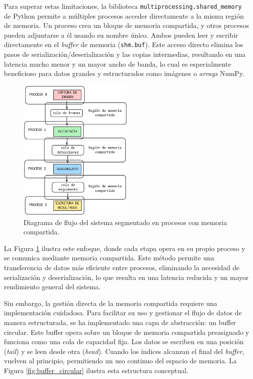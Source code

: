 \documentclass[11pt,spanish,listoffigures,listoftables]{tfgetsinf}
\begin{document}
Para superar estas limitaciones, la biblioteca \texttt{multiprocessing.shared\_memory} de Python permite a múltiples procesos acceder directamente a la misma región de memoria. Un proceso crea un bloque de memoria compartida, y otros procesos pueden adjuntarse a él usando su nombre único. Ambos pueden leer y escribir directamente en el \textit{buffer} de memoria (\texttt{shm.buf}). Este acceso directo elimina los pasos de serialización/deserialización y las copias intermedias, resultando en una latencia mucho menor y un mayor ancho de banda, lo cual es especialmente beneficioso para datos grandes y estructurados como imágenes o \textit{arrays} NumPy.


\begin{figure}[H]
   \centering
   \includegraphics[width=0.5\textwidth]{images/diseno_e_implementacion/segmentacion_procesos_memoria_compartida.png}
   \caption[Diagrama de flujo del sistema segmentado en procesos con memoria compartida]{Diagrama de flujo del sistema segmentado en procesos con memoria compartida.}
   \label{fig:segmentacion_procesos_memoria_compartida}
\end{figure}

La Figura \ref{fig:segmentacion_procesos_memoria_compartida} ilustra este enfoque, donde cada etapa opera en su propio proceso y se comunica mediante memoria compartida. Este método permite una transferencia de datos más eficiente entre procesos, eliminando la necesidad de serialización y deserialización, lo que resulta en una latencia reducida y un mayor rendimiento general del sistema.


Sin embargo, la gestión directa de la memoria compartida requiere una implementación cuidadosa. Para facilitar su uso y gestionar el flujo de datos de manera estructurada, se ha implementado una capa de abstracción: un buffer circular. Este buffer opera sobre un bloque de memoria compartida preasignado y funciona como una cola de capacidad fija. Los datos se escriben en una posición (\textit{tail}) y se leen desde otra (\textit{head}). Cuando los índices alcanzan el final del \textit{buffer}, vuelven al principio, permitiendo un uso continuo del espacio de memoria. La Figura \ref{fig:buffer_circular} ilustra esta estructura conceptual.
\end{document}

